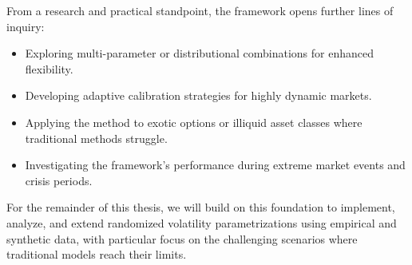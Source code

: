 From a research and practical standpoint, the framework opens further lines of inquiry:
\begin{itemize}
    \item Exploring multi-parameter or distributional combinations for enhanced flexibility.
    \item Developing adaptive calibration strategies for highly dynamic markets.
    \item Applying the method to exotic options or illiquid asset classes where traditional methods struggle.
    \item Investigating the framework's performance during extreme market events and crisis periods.
\end{itemize}

For the remainder of this thesis, we will build on this foundation to implement, analyze, and extend randomized volatility parametrizations using empirical and synthetic data, with particular focus on the challenging scenarios where traditional models reach their limits.
